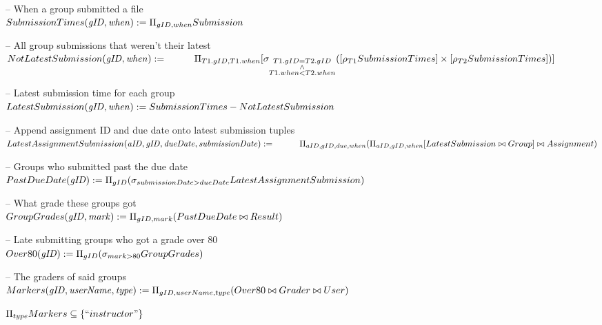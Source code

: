 \documentclass{article}
\newcommand{\var}[1]{\mathit{#1}}
\begin{document}
\begin{enumerate}
{~}\\ %
{\large %
-- When a group submitted a file \\[5pt]
$
SubmissionTimes(\var{gID, when}) :=
	\Pi_{gID, when} Submission \\[10pt]
$

-- All group submissions that weren't their latest \\[5pt]
$
NotLatestSubmission(\var{gID, when}) := \\[5pt]
    \hspace*{1cm}
	\Pi_{T1.gID, T1.when}
	[\sigma_{\substack{T1.gID = T2.gID \\ \wedge \\ T1.when < T2.when}}
	([\rho_{T1}SubmissionTimes] \times [\rho_{T2}SubmissionTimes])] \\[10pt]
$

-- Latest submission time for each group \\[5pt]
$
LatestSubmission(\var{gID, when}) :=
	SubmissionTimes - NotLatestSubmission \\[10pt]
$

-- Append assignment ID and due date onto latest submission tuples \\[5pt]
$
LatestAssignmentSubmission(\var{aID, gID, dueDate, submissionDate}) := \\[5pt]
    \hspace*{1cm}
	\Pi_{aID, gID, due, when}
	(\Pi_{aID, gID, when} [LatestSubmission \bowtie Group] \bowtie Assignment) \\[10pt]
$

-- Groups who submitted past the due date \\[5pt]
$
PastDueDate(\var{gID}) :=
    \Pi_{gID}
    (\sigma_{submissionDate > dueDate}
    LatestAssignmentSubmission) \\[10pt]
$

-- What grade these groups got \\[5pt]
$
GroupGrades(\var{gID, mark}) :=
    \Pi_{gID, mark}
    (PastDueDate \bowtie Result) \\[10pt]
$

-- Late submitting groups who got a grade over 80 \\[5pt]
$
Over80(\var{gID}) :=
    \Pi_{gID}
    (\sigma_{mark > 80}
    GroupGrades) \\[10pt]
$

-- The graders of said groups \\[5pt]
$
Markers(\var{gID, userName, type}) :=
    \Pi_{gID, userName, type}
    (Over80 \bowtie Grader \bowtie User) \\[10pt]
$

$
\Pi_{type} Markers \subseteq \{``instructor"\} \\[10pt]
$
} %

\end{enumerate}
\end{document}

